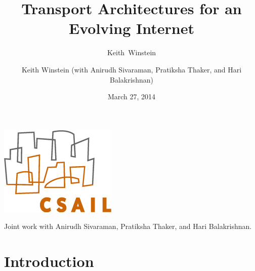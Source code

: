 \documentclass[svgnames]{beamer}
\title{Transport Architectures for an Evolving Internet}
\author{Keith~Winstein}
\institute{MIT Computer Science and Artificial Intelligence Laboratory\\\vspace{\baselineskip}\textcolor{DarkBlue}{}}
\date{March 27, 2014}
\begin{document}
\begin{frame}[plain]

\titlepage

\begin{centering}

\includegraphics[width=2 cm]{csaillogomed.png}

\vspace{\baselineskip}
\vspace{\baselineskip}

\tiny Joint work with Anirudh Sivaraman, Pratiksha Thaker, and Hari Balakrishnan.

\end{centering}

\end{frame}

\author{Keith Winstein (with Anirudh Sivaraman, Pratiksha Thaker, and Hari Balakrishnan)}

\institute{}

\section{Introduction}
\end{document}

